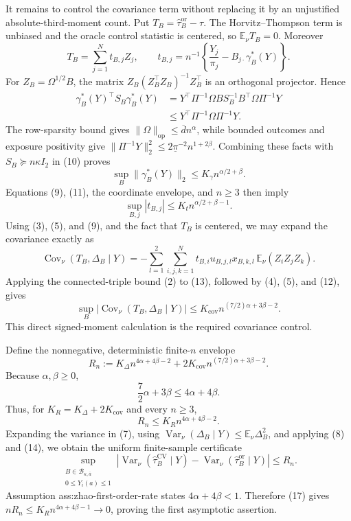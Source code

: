 It remains to control the covariance term without replacing it by an unjustified absolute-third-moment count.  Put \(T_B=\widehat\tau_B^{\mathrm{or}}-\tau\).  The Horvitz--Thompson term is unbiased and the oracle control statistic is centered, so \(\mathbb E_\nu T_B=0\).  Moreover
\[
 T_B=\sum_{j=1}^{N}t_{B,j}Z_j,
 \qquad
 t_{B,j}=n^{-1}\left\{\frac{Y_j}{\pi_j}-B_{j\cdot}\gamma_B^*(Y)\right\}.
 \tag{9}
\]
For \(Z_B=\Omega^{1/2}B\), the matrix \(Z_B(Z_B^\top Z_B)^{-1}Z_B^\top\) is an orthogonal projector.  Hence
\[
 \begin{aligned}
 \gamma_B^*(Y)^\top S_B\gamma_B^*(Y)
 &=Y^\top\Pi^{-1}\Omega B S_B^{-1}B^\top\Omega\Pi^{-1}Y\\
 &\leq Y^\top\Pi^{-1}\Omega\Pi^{-1}Y.
 \end{aligned}
 \tag{10}
\]
The row-sparsity bound gives \(\lVert\Omega\rVert_{\mathrm{op}}\leq\overline d n^\alpha\), while bounded outcomes and exposure positivity give \(\lVert\Pi^{-1}Y\rVert_2^2\leq2\underline\pi^{-2}n^{1+2\beta}\).  Combining these facts with \(S_B\succeq n\kappa I_2\) in (10) proves
\[
 \sup_B\lVert\gamma_B^*(Y)\rVert_2
 \leq K_\gamma n^{\alpha/2+\beta}.
 \tag{11}
\]
Equations (9), (11), the coordinate envelope, and \(n\geq3\) then imply
\[
 \sup_{B,j}|t_{B,j}|
 \leq K_t n^{\alpha/2+\beta-1}.
 \tag{12}
\]
Using (3), (5), and (9), and the fact that \(T_B\) is centered, we may expand the covariance exactly as
\[
 \operatorname{Cov}_\nu(T_B,\Delta_B\mid Y)
 =-\sum_{l=1}^{2}\sum_{i,j,k=1}^{N}
 t_{B,i}u_{B,j,l}x_{B,k,l}\,
 \mathbb E_\nu(Z_iZ_jZ_k).
 \tag{13}
\]
Applying the connected-triple bound (2) to (13), followed by (4), (5), and (12), gives
\[
 \sup_B\left|\operatorname{Cov}_\nu(T_B,\Delta_B\mid Y)\right|
 \leq K_{\mathrm{cov}}n^{(7/2)\alpha+3\beta-2}.
 \tag{14}
\]
This direct signed-moment calculation is the required covariance control.

Define the nonnegative, deterministic finite-\(n\) envelope
\[
 R_n
 :=K_\Delta n^{4\alpha+4\beta-2}
 +2K_{\mathrm{cov}}n^{(7/2)\alpha+3\beta-2}.
 \tag{15}
\]
Because \(\alpha,\beta\geq0\),
\[
 \frac{7}{2}\alpha+3\beta
 \leq4\alpha+4\beta.
 \tag{16}
\]
Thus, for \(K_R=K_\Delta+2K_{\mathrm{cov}}\) and every \(n\geq3\),
\[
 R_n\leq K_Rn^{4\alpha+4\beta-2}.
 \tag{17}
\]
Expanding the variance in (7), using \(\operatorname{Var}_\nu(\Delta_B\mid Y)\leq\mathbb E_\nu\Delta_B^2\), and applying (8) and (14), we obtain the uniform finite-sample certificate
\[
 \sup_{\substack{B\in\mathcal B_{\kappa,\overline a}\\0\leq Y_i(a)\leq1}}
 \left|
 \operatorname{Var}_\nu(\widehat\tau_B^{\mathrm{CV}}\mid Y)
 -\operatorname{Var}_\nu(\widehat\tau_B^{\mathrm{or}}\mid Y)
 \right|
 \leq R_n.
 \tag{18}
\]
Assumption ass:zhao-first-order-rate states \(4\alpha+4\beta<1\).  Therefore (17) gives \(nR_n\leq K_Rn^{4\alpha+4\beta-1}\to0\), proving the first asymptotic assertion.

